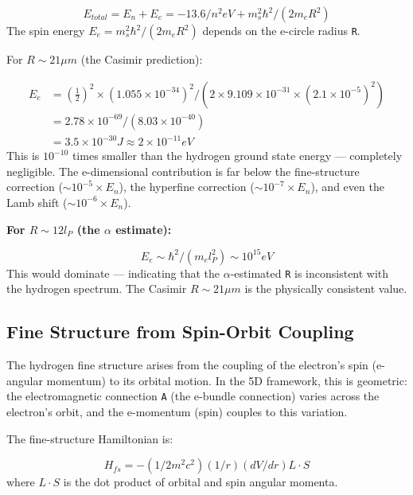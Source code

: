 \documentclass[aps,prd,preprint,superscriptaddress,longbibliography,floatfix]{revtex4-2}
\theoremstyle{remark}
\begin{document}
\begin{equation}
    E_{total} = E_n + E_e = -13.6/n^{2} eV + m_{s}^{2}\hbar^{2}/(2m_e R^{2})
\end{equation}
The spin energy $E_e = m_{s}^{2}\hbar^{2}/(2m_e R^{2})$ depends on the e-circle radius \texttt{R}.

For $R \sim  21 \mu m$ (the Casimir prediction):


\begin{align}
    E_e &= (\tfrac{1}{2})^{2} \times (1.055 \times 10^{-34})^{2} / (2 \times 9.109 \times 10^{-31} \times (2.1 \times 10^{-5})^{2}) \\
    & = 2.78 \times 10^{-69} / (8.03 \times 10^{-40}) \\
    & = 3.5 \times 10^{-30} J \approx 2 \times 10^{-11} eV
\end{align}
This is $10^{-10}$ times smaller than the hydrogen ground state energy --- completely negligible. The e-dimensional contribution is far below the fine-structure correction ($\sim 10^{-5} \times E_n$), the hyperfine correction ($\sim 10^{-7} \times E_n$), and even the Lamb shift ($\sim 10^{-6} \times E_n$).

\textbf{For $R \sim  12 l_P$ (the $\alpha$ estimate):}


\begin{equation}
    E_e \sim  \hbar^{2}/(m_e l_P^{2}) \sim  10^{15} eV
\end{equation}
This would dominate --- indicating that the $\alpha$-estimated \texttt{R} is inconsistent with the hydrogen spectrum. The Casimir $R \sim  21 \mu m$ is the physically consistent value.


\subsection{Fine Structure from Spin-Orbit Coupling}

The hydrogen fine structure arises from the coupling of the electron's spin (e-angular momentum) to its orbital motion. In the 5D framework, this is geometric: the electromagnetic connection \texttt{A} (the e-bundle connection) varies across the electron's orbit, and the e-momentum (spin) couples to this variation.

The fine-structure Hamiltonian is:


\begin{equation}
    H_{fs} = -(1/2m^{2}c^{2}) (1/r)(dV/dr) L \cdot S
\end{equation}
where $L \cdot S$ is the dot product of orbital and spin angular momenta.
\end{document}
